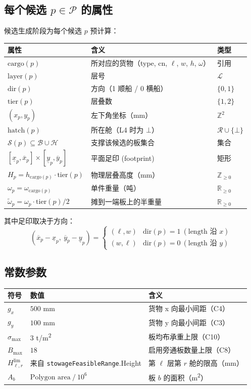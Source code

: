 \documentclass[a4paper,11pt]{ctexart}
\newcommand{\R}{\mathbb{R}}
\newcommand{\Z}{\mathbb{Z}}
\newcommand{\B}{\{0,1\}}
\newcommand{\set}[1]{\mathcal{#1}}
\begin{document}
\subsection{每个候选 $p\in\set{P}$ 的属性}

候选生成阶段为每个候选 $p$ 预计算：

\begin{longtable}{@{}lll@{}}
\toprule
属性 & 含义 & 类型 \\
\midrule
$\text{cargo}(p)$ & 所对应的货物（type, cn, $\ell$, $w$, $h$, $\omega$） & 引用 \\
$\text{layer}(p)$ & 层号 & $\set{L}$ \\
$\text{dir}(p)$ & 方向（1 顺船 / 0 横船） & $\B$ \\
$\text{tier}(p)$ & 层叠数 & $\{1,2\}$ \\
$(x_p, y_p)$ & 左下角坐标（mm） & $\Z^2$ \\
$\text{hatch}(p)$ & 所在舱（L4 时为 $\bot$） & $\set{R}\cup\{\bot\}$ \\
$\set{S}(p)\subseteq\set{B}\cup\set{H}$ & 支撑该候选的板集合 & 集合 \\
$[\underline{x}_p,\overline{x}_p]\times[\underline{y}_p,\overline{y}_p]$ & 平面足印 (footprint) & 矩形 \\
$H_p = h_{\text{cargo}(p)}\cdot\text{tier}(p)$ & 物理层叠高度（mm） & $\Z_{\geq 0}$ \\
$\omega_p = \omega_{\text{cargo}(p)}$ & 单件重量（吨） & $\R_{\geq 0}$ \\
$\widetilde\omega_p = \omega_p\cdot\text{tier}(p)/2$ & 摊到一端板上的半重量 & $\R_{\geq 0}$ \\
\bottomrule
\end{longtable}

其中足印取决于方向：
\[
(\overline{x}_p-\underline{x}_p,\ \overline{y}_p-\underline{y}_p) =
\begin{cases}
(\ell, w) & \text{dir}(p)=1\ (\text{length 沿 }x)\\
(w, \ell) & \text{dir}(p)=0\ (\text{length 沿 }y)
\end{cases}
\]

\subsection{常数参数}

\begin{longtable}{@{}lll@{}}
\toprule
符号 & 数值 & 含义 \\
\midrule
$g_x$ & $500$ mm & 货物 x 向最小间距（C4） \\
$g_y$ & $100$ mm & 货物 y 向最小间距（C3） \\
$\sigma_{\max}$ & $3$ t/m\textsuperscript{2} & 板均布承重上限（C10） \\
$B_{\max}$ & $18$ & 启用旁通板数量上限（C8） \\
$H^{\text{lim}}_{\ell, r}$ & 来自 \texttt{stowageFeasibleRange}.Height & 第 $\ell$ 层第 $r$ 舱的限高（mm）\\
$A_b$ & $\text{Polygon area}\ /\ 10^6$ & 板 $b$ 的面积（m\textsuperscript{2}） \\
\bottomrule
\end{longtable}
\end{document}
